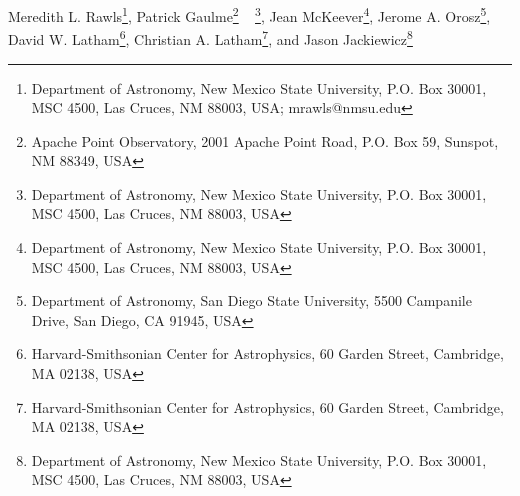 
Meredith L. Rawls\footnote{Department of Astronomy, New Mexico State University, P.O. Box 30001, MSC 4500, Las Cruces, NM 88003, USA; mrawls@nmsu.edu},
\setcounter{footnote}{1}
Patrick Gaulme\footnote{Apache Point Observatory, 2001 Apache Point Road, P.O. Box 59, Sunspot, NM 88349, USA} \ \setcounter{footnote}{0} \footnote{Department of Astronomy, New Mexico State University, P.O. Box 30001, MSC 4500, Las Cruces, NM 88003, USA},
\setcounter{footnote}{0}
Jean McKeever\footnote{Department of Astronomy, New Mexico State University, P.O. Box 30001, MSC 4500, Las Cruces, NM 88003, USA},
\setcounter{footnote}{2}
Jerome A. Orosz\footnote{Department of Astronomy, San Diego State University, 5500 Campanile Drive, San Diego, CA 91945, USA},
David W. Latham\footnote{Harvard-Smithsonian Center for Astrophysics, 60 Garden Street, Cambridge, MA 02138, USA},
\setcounter{footnote}{3}
Christian A. Latham\footnote{Harvard-Smithsonian Center for Astrophysics, 60 Garden Street, Cambridge, MA 02138, USA}, and 
\setcounter{footnote}{0}
Jason Jackiewicz\footnote{Department of Astronomy, New Mexico State University, P.O. Box 30001, MSC 4500, Las Cruces, NM 88003, USA}
